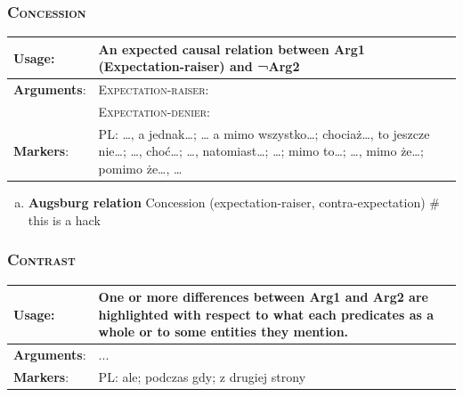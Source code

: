 \documentclass{udisc}
\begin{document}

\subsubsection{\textsc{Concession}}

\begin{tabularx}{\textwidth}{|l|L|}
\hline

\textbf{Usage}:           &  An expected causal relation between Arg1 (Expectation-raiser) and ¬Arg2\\
\hline

\textbf{Arguments}:       &  \textsc{Expectation-raiser}: \\
                          &  \textsc{Expectation-denier}:  \\
\hline

\textbf{Markers}:         &  PL: …, a jednak…; … a mimo wszystko…; chociaż…, to jeszcze nie…; …, choć…; …, natomiast…; …; mimo to…; …, mimo że…; pomimo że…, … \\
\hline

\end{tabularx}

\begin{enumerate}[a)]
\item \textbf{Augsburg relation} Concession (expectation-raiser, contra-expectation)
\nonstopmode # this is a hack
\end{enumerate}
\errorstopmode

        

\subsubsection{\textsc{Contrast}}

\begin{tabularx}{\textwidth}{|l|L|}
\hline

\textbf{Usage}:           &  One or more differences between Arg1 and Arg2 are highlighted with respect to what each predicates as a whole or to some entities they mention. \\
\hline

\textbf{Arguments}:       &  ... \\
\hline

\textbf{Markers}:        &  PL: ale; podczas gdy; z drugiej strony \\
\hline

\end{tabularx}
\end{document}
